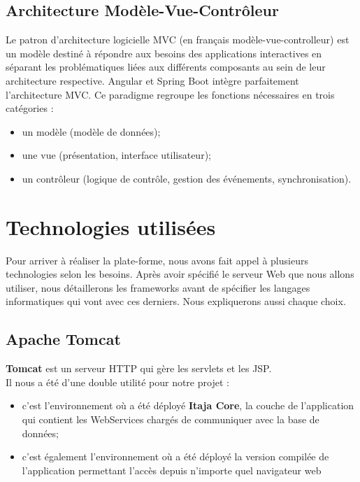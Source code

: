 \documentclass[12pt]{report}
\begin{document}
	 \subsection{Architecture Modèle-Vue-Contrôleur}
	    Le patron d'architecture logicielle \gls{MVC} (en français modèle-vue-controlleur) est un modèle destiné à répondre aux besoins des applications interactives en séparant les problématiques liées aux différents composants au sein de leur architecture respective. Angular et Spring Boot intègre parfaitement l'architecture \gls{MVC}.\cite{mvc}
	    Ce paradigme regroupe les fonctions nécessaires en trois catégories :
	    \begin{itemize}
	      \item un modèle (modèle de données);
	      \item une vue (présentation, interface utilisateur);
	      \item un contrôleur (logique de contrôle, gestion des événements, synchronisation).
	    \end{itemize}

      \section{Technologies utilisées}
	Pour arriver à réaliser la plate-forme, nous avons fait appel à plusieurs technologies selon les besoins. Après avoir spécifié le serveur Web que nous allons utiliser, nous détaillerons les frameworks avant de spécifier les langages informatiques qui vont avec ces derniers. Nous expliquerons aussi chaque choix.
	
	\subsection{Apache Tomcat}
	  \textbf{Tomcat} est un serveur \gls{HTTP} qui gère les servlets et les \gls{JSP}.\cite{apache}
	  \\Il nous a été d'une double utilité pour notre projet :
	  \begin{itemize}
	    \item c'est l'environnement où a été déployé \textbf{Itaja Core}, la couche de l'application qui contient les WebServices chargés de communiquer avec la base de données;
	    \item c'est également l'environnement où a été déployé la version compilée de l'application permettant l'accès depuis n'importe quel navigateur web
	  \end{itemize}
	  
\end{document}
